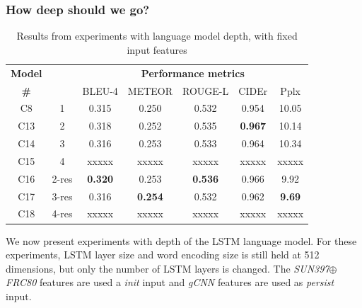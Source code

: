 \subsubsection{How deep should we go?}
\begin{table}[htp]
  \centering
  \newcommand{\bs}{\small}
  \begin{adjustbox}{center}
  \begin{tabular}{|c|c|c|c|c|c|c|}
    \hline
    \bf Model & \bf \multirow{2}{*}{Depth} & \multicolumn{5}{c|}{\bf Performance metrics}\\
    \cline{3-7}
    \bf \# &\bf &\bs BLEU-4 &\bs METEOR &\bs ROUGE-L &\bs CIDEr&\bs Pplx \\\hline
    C8  & 1   & 0.315 & 0.250 & 0.532 & 0.954 &10.05  \\\hline
    C13 & 2   & 0.318 & 0.252 & 0.535 &\bf0.967 & 10.14  \\
    C14 & 3   & 0.316 & 0.253 & 0.533 & 0.964   & 10.34  \\
    C15 & 4   & xxxxx & xxxxx & xxxxx & xxxxx   & xxxxx  \\\hline
    C16 &2-res&\bf0.320& 0.253 &\bf0.536&0.966  & 9.92   \\
    C17 &3-res& 0.316 &\bf0.254&0.532 & 0.962   &\bf9.69 \\
    C18 &4-res& xxxxx &xxxxx&xxxxx & xxxxx   &xxxxx\\\hline
  \end{tabular}
  \end{adjustbox}
  \caption{Results from experiments with language model depth, with fixed input features}
  \label{tab:resultsVal}
\end{table}

We now present experiments with depth of the LSTM language model.
For these experiments, LSTM layer size and word encoding size is still held at
512 dimensions, but only the number of LSTM layers is changed.
The \emph{SUN397$\oplus$FRC80} features are used a \emph{init} input and
\emph{gCNN} features are used as \emph{persist} input.




